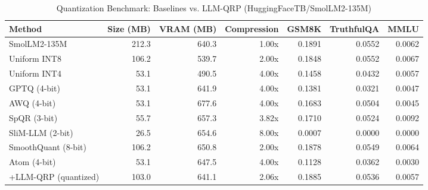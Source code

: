 \begin{table}[htbp]
  \centering
  \small
  \caption{Quantization Benchmark: Baselines vs. LLM-QRP (HuggingFaceTB/SmolLM2-135M)}
  \label{tab:benchmark}
  \begin{tabular}{lrrrrrr}
    \toprule
    \textbf{Method} & \textbf{Size (MB)} & \textbf{VRAM (MB)} & \textbf{Compression} & \textbf{GSM8K} & \textbf{TruthfulQA} & \textbf{MMLU} \\
    \midrule
    SmolLM2-135M & 212.3 & 640.3 & 1.00x & 0.1891 & 0.0552 & 0.0062 \\
    Uniform INT8 & 106.2 & 539.7 & 2.00x & 0.1848 & 0.0552 & 0.0067 \\
    Uniform INT4 & 53.1 & 490.5 & 4.00x & 0.1458 & 0.0432 & 0.0057 \\
    GPTQ (4-bit) & 53.1 & 641.9 & 4.00x & 0.1381 & 0.0321 & 0.0047 \\
    AWQ (4-bit) & 53.1 & 677.6 & 4.00x & 0.1683 & 0.0504 & 0.0045 \\
    SpQR (3-bit) & 55.7 & 657.3 & 3.82x & 0.1710 & 0.0524 & 0.0092 \\
    SliM-LLM (2-bit) & 26.5 & 654.6 & 8.00x & 0.0007 & 0.0000 & 0.0000 \\
    SmoothQuant (8-bit) & 106.2 & 650.8 & 2.00x & 0.1878 & 0.0549 & 0.0064 \\
    Atom (4-bit) & 53.1 & 647.5 & 4.00x & 0.1128 & 0.0362 & 0.0030 \\
    \midrule
    +LLM-QRP (quantized) & 103.0 & 641.1 & 2.06x & 0.1885 & 0.0536 & 0.0057 \\
    \bottomrule
  \end{tabular}
\end{table}
